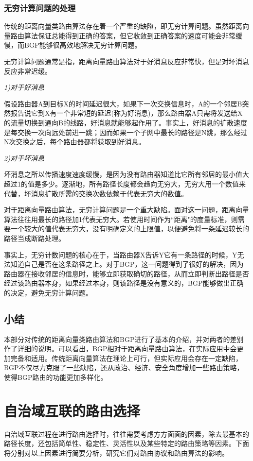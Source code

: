 \documentclass[11pt,twocolumn]{article}
\begin{document}
\subsubsection{无穷计算问题的处理}

传统的距离向量类路由算法存在着一个严重的缺陷，即无穷计算问题。虽然距离向量路由算法保证总能得到正确的答案，但它收敛到正确答案的速度可能会非常缓慢，而BGP能够很高效地解决无穷计算问题。

无穷计算问题通常是指，距离向量路由算法对于好消息反应非常快，但是对坏消息反应非常迟缓。\cite{CN}

\noindent\emph{1)\quad 对于好消息}

假设路由器A到目标X的时间延迟很大，如果下一次交换信息时，A的一个邻居B突然报告说它到X有一个非常短的延迟(称为好消息)，那么路由器A只需将发送给X的流量切换到通向B的线路，好消息就能够起作用了。事实上，好消息的扩散速度是每交换一次向远处前进一跳；因而如果一个子网中最长的路径是N跳，那么经过N次交换之后，每个路由器都将获取到好消息。

\noindent\emph{2)\quad 对于坏消息}

坏消息之所以传播速度速度缓慢，是因为没有路由器知道比它所有邻居的最小值大超过1的值是多少。逐渐地，所有路径长度都会趋向无穷大，无穷大用一个数值来代替，坏消息扩散所需的交换次数依赖于代表无穷大的数值。

对于距离向量路由算法，无穷计算问题是一个重大缺陷。面对这一问题，距离向量算法往往用最长的路径加1代表无穷大。若使用时间作为``距离"的度量标准，则需要一个较大的值代表无穷大，没有明确定义的上限值，以便避免将一条延迟较长的路径当成断路处理。

事实上，无穷计数问题的核心在于，当路由器X告诉Y它有一条路径的时候，Y无法知道自己是否在这条路径之上\cite{CN}。对于BGP，这一问题得到了很好的解决，因为路由器在接收邻居的信息时，能够立即获取确切的路径，从而立即判断出路径是否经过该路由器本身，如果经过本身，则该路径是没有意义的，BGP能够做出正确的决定，避免无穷计算问题\cite{Count}。

\subsection{小结}
本部分对传统的距离向量类路由算法和BGP进行了基本的介绍，并对两者的差别作了详细的说明。可以看出，BGP相对于距离向量路由算法，在实际应用中会更加完备和适用。传统距离向量算法在理论上可行，但实际应用会存在一定缺陷，BGP不仅尽力克服了一些缺陷，还从政治、经济、安全角度增加一些路由策略，使得BGP路由的功能更加多样化。


\section{自治域互联的路由选择}
自治域互联过程在进行路由选择时，往往需要考虑方方面面的因素，除去最基本的路径长度，还包括简单性、稳定性、灵活性以及某些特定的路由策略等因素。下面将分别对以上因素进行简要分析，研究它们对路由协议和路由算法的影响。
\end{document}
